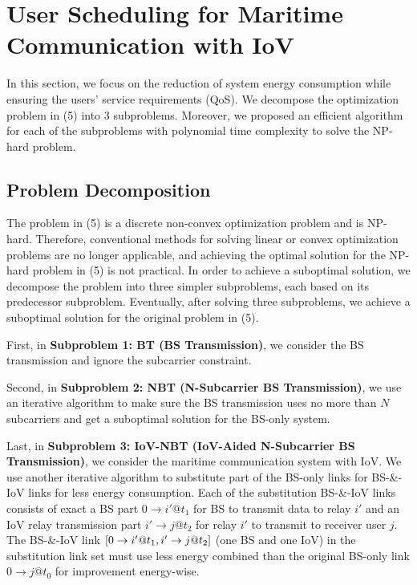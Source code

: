 \documentclass{ieeeaccess}
\begin{document}
\section{User Scheduling for Maritime Communication with IoV }
In this section, we focus on the reduction of system energy consumption while ensuring the users' service requirements (QoS). We decompose the optimization problem in (5) into 3 subproblems. Moreover, we proposed an efficient algorithm for each of the subproblems with polynomial time complexity to solve the NP-hard problem.


\subsection{Problem Decomposition}

The problem in (5) is a discrete non-convex optimization problem and is NP-hard. Therefore, conventional methods for solving linear or convex optimization problems are no longer applicable, and achieving the optimal solution for the NP-hard problem in (5) is not practical. 
In order to achieve a suboptimal solution, we decompose the problem into three simpler subproblems, each based on its predecessor subproblem. Eventually, after solving three subproblems, we achieve a suboptimal solution for the original problem in (5).

First, in \textbf{Subproblem 1: BT (BS Transmission)}, we consider the BS transmission and ignore the subcarrier constraint. 

Second, in \textbf{Subproblem 2: NBT (N-Subcarrier BS Transmission)}, we use an iterative algorithm to make sure the BS transmission uses no more than $N$ subcarriers and get a suboptimal solution for the BS-only system. 

Last, in \textbf{Subproblem 3: IoV-NBT (IoV-Aided N-Subcarrier BS Transmission)}, we consider the maritime communication system with IoV. We use another iterative algorithm to substitute part of the BS-only links for BS-\&-IoV links for less energy consumption. Each of the substitution BS-\&-IoV links consists of exact a BS part $0 \to i'@{t_1}$ for BS to transmit data to relay ${i'}$ and an IoV relay transmission part $i' \to j@{t_2}$ for relay ${i'}$ to transmit to receiver user $j$. The BS-\&-IoV link $\left[ {{\rm{0}} \to i'@{t_1},i' \to j@{t_2}} \right]$ (one BS and one IoV) in the substitution link set must use less energy combined than the original BS-only link $0 \to j@{t_0}$ for improvement energy-wise. 
\end{document}
